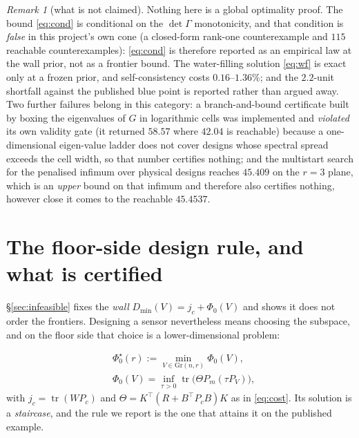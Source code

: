 \documentclass[journal]{IEEEtran}
\theoremstyle{remark}
\newtheorem{remark}{Remark}
\begin{document}
\begin{remark}[what is not claimed]
\label{rmk:notclaimed}
Nothing here is a global optimality proof. The bound \eqref{eq:cond} is
conditional on the $\det\Gamma$ monotonicity, and that condition is \emph{false}
in this project's own cone (a closed-form rank-one counterexample and $115$
reachable counterexamples): \eqref{eq:cond} is therefore reported as an empirical
law at the wall prior, not as a frontier bound. The water-filling solution
\eqref{eq:wf} is exact only at a frozen prior, and self-consistency costs
$0.16$--$1.36\%$; and the $2.2$-unit shortfall against the published blue point
is reported rather than argued away. Two further failures belong in this
category: a branch-and-bound certificate built by boxing the eigenvalues of $G$
in logarithmic cells was implemented and \emph{violated} its own validity gate
(it returned $58.57$ where $42.04$ is reachable) because a one-dimensional
eigen-value ladder does not cover designs whose spectral spread exceeds the cell
width, so that number certifies nothing; and the multistart search for the
penalised infimum over physical designs reaches $45.409$ on the $r=3$ plane,
which is an \emph{upper} bound on that infimum and therefore also certifies
nothing, however close it comes to the reachable $45.4537$.

\end{remark}
\section{The floor-side design rule, and what is certified}\label{sec:floor}

\S\ref{sec:infeasible} fixes the \emph{wall} $D_{\min}(V)=j_c+\Phi_0(V)$ and shows
it does not order the frontiers. Designing a sensor nevertheless means choosing
the subspace, and on the floor side that choice is a lower-dimensional problem:

\begin{equation}
  \begin{aligned}
  &\Phi_0^{\star}(r):=\min_{V\in\mathrm{Gr}(n,r)}\Phi_0(V),\\
  &\Phi_0(V)=\inf_{\tau>0}\operatorname{tr}\big(\Theta P_m(\tau P_V)\big),
  \end{aligned}
  \label{eq:flooropt}
\end{equation}
with $j_c=\operatorname{tr}(WP_c)$ and $\Theta=K^{\top}(R+B^{\top}P_cB)K$ as in
\eqref{eq:cost}. Its solution is a \emph{staircase}, and the rule we report is the
one that attains it on the published example.
\end{document}
